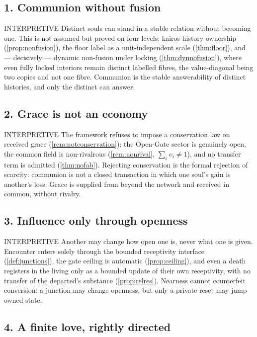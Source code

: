 \documentclass[11pt,a4paper]{article}
\def\emph#1{#1}%
\newcommand{\stInterp}{\textcolor{cInt}{\textsf{\small INTERPRETIVE}}}
\theoremstyle{definition}
\theoremstyle{plain}
\theoremstyle{remark}
\begin{document}
\subsection*{1. Communion without fusion}

\stInterp\quad
Distinct souls can stand in a stable relation without becoming one. This is not assumed but
proved on four levels: kairos-history ownership (\ref{prop:nonfusion}), the floor label as a
unit-independent scale (\ref{thm:floor}), and --- decisively --- dynamic non-fusion under
locking (\ref{thm:dynnofusion}), where even fully locked interiors remain distinct labelled
fibres, the value-diagonal being two copies and not one fibre. Communion is the
\emph{stable answerability of distinct histories}, and only the distinct can answer.

\subsection*{2. Grace is not an economy}

\stInterp\quad
The framework refuses to impose a conservation law on received grace
(\ref{rem:notconservation}): the Open-Gate sector is genuinely open, the common field is
non-rivalrous (\ref{rem:nonrival}, \(\sum_i\upsilon_i\neq1\)), and no transfer term is
admitted (\ref{thm:nofab}). Rejecting conservation is the formal rejection of scarcity:
communion is not a closed transaction in which one soul's gain is another's loss. Grace is
supplied from beyond the network and received in common, without rivalry.

\subsection*{3. Influence only through openness}

\stInterp\quad
Another may change how open one is, never what one is given. Encounter enters solely through
the bounded receptivity interface (\ref{def:junctions}), the gate ceiling is automatic
(\ref{prop:ceiling}), and even a death registers in the living only as a bounded update of
their own receptivity, with no transfer of the departed's substance (\ref{prop:relres}).
Nearness cannot counterfeit conversion: a junction may change openness, but only a private
reset may jump owned state.

\subsection*{4. A finite love, rightly directed}
\end{document}
